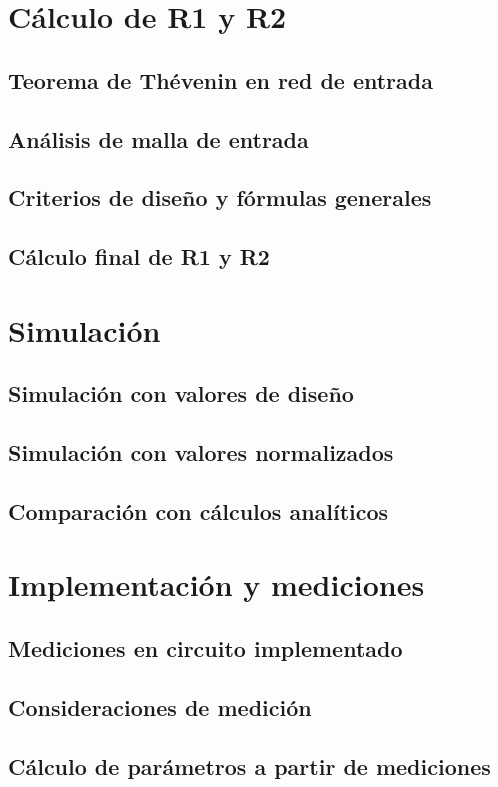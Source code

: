 \documentclass[chaptersright]{informeutn}
\begin{document}
  \section{Cálculo de R1 y R2}
    \subsection{Teorema de Thévenin en red de entrada}
    \subsection{Análisis de malla de entrada}
    \subsection{Criterios de diseño y fórmulas generales}
    \subsection{Cálculo final de R1 y R2}
  \section{Simulación}
    \subsection{Simulación con valores de diseño}
    \subsection{Simulación con valores normalizados}
    \subsection{Comparación con cálculos analíticos}
  \section{Implementación y mediciones}
    \subsection{Mediciones en circuito implementado}
    \subsection{Consideraciones de medición}
    \subsection{Cálculo de parámetros a partir de mediciones}
\end{document}
